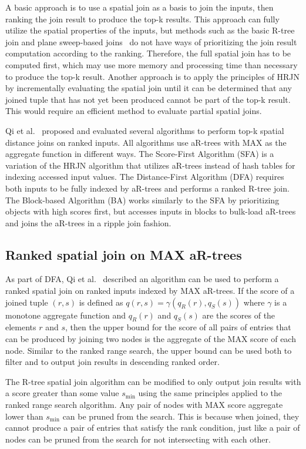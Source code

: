 A basic approach is to use a spatial join as a basis to join the inputs, then ranking the join result to produce the top-k results. This approach can fully utilize the spatial properties of the inputs, but methods such as the basic R-tree join and plane sweep-based joins~\cite{arge1998scalable} do not have ways of prioritizing the join result computation according to the ranking. Therefore, the full spatial join has to be computed first, which may use more memory and processing time than necessary to produce the top-k result. Another approach is to apply the principles of HRJN by incrementally evaluating the spatial join until it can be determined that any joined tuple that has not yet been produced cannot be part of the top-k result. This would require an efficient method to evaluate partial spatial joins.

Qi et al.~\cite{qi2013efficient} proposed and evaluated several algorithms to perform top-k spatial distance joins on ranked inputs. All algorithms use aR-trees with MAX as the aggregate function in different ways. The Score-First Algorithm (SFA) is a variation of the HRJN algorithm that utilizes aR-trees instead of hash tables for indexing accessed input values. The Distance-First Algorithm (DFA) requires both inputs to be fully indexed by aR-trees and performs a ranked R-tree join. The Block-based Algorithm (BA) works similarly to the SFA by prioritizing objects with high scores first, but accesses inputs in blocks to bulk-load aR-trees and joins the aR-trees in a ripple join fashion.

\subsection{Ranked spatial join on MAX aR-trees}

As part of DFA, Qi et al.~\cite{qi2013efficient} described an algorithm can be used to perform a ranked spatial join on ranked inputs indexed by MAX aR-trees. If the score of a joined tuple \((r, s)\) is defined as \(q(r, s) = \gamma(q_R(r), q_S(s))\) where \(\gamma\) is a monotone aggregate function and \(q_R(r)\) and \(q_S(s)\) are the scores of the elements \(r\) and \(s\), then the upper bound for the score of all pairs of entries that can be produced by joining two nodes is the aggregate of the MAX score of each node. Similar to the ranked range search, the upper bound can be used both to filter and to output join results in descending ranked order.

The R-tree spatial join algorithm can be modified to only output join results with a score greater than some value \(s_{\min}\) using the same principles applied to the ranked range search algorithm. Any pair of nodes with MAX score aggregate lower than \(s_{\min}\) can be pruned from the search. This is because when joined, they cannot produce a pair of entries that satisfy the rank condition, just like a pair of nodes can be pruned from the search for not intersecting with each other.

